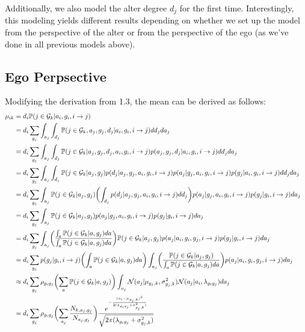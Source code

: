 \documentclass[12pt]{article}
\begin{document}
\noindent Additionally, we also model the alter degree $d_j$ for the first time. Interestingly, this modeling yields different results depending on whether we set up the model from the perspective of the alter or from the perspective of the ego (as we've done in all previous models above). 

\pagebreak
\subsection{Ego Perpsective}

\noindent Modifying the derivation from 1.3, the mean can be derived as follows:
\begin{align}
\mu_{ik} 
&= d_i \mathbb{P}( j \in \mathcal{G}_k | a_i, g_i, i \to j) && \\\nonumber
&= d_i \sum_{g_j} \int_{a_j} \int_{d_j} \mathbb{P}( j \in \mathcal{G}_k, a_j, g_j, d_j | a_i, g_i, i \to j) dd_j da_j && \\\nonumber
&= d_i \sum_{g_j} \int_{a_j} \int_{d_j} \mathbb{P}( j \in \mathcal{G}_k | a_j, g_j, d_j, a_i, g_i, i \to j) p(a_j, g_j, d_j | a_i, g_i, i \to j) dd_j da_j && \\\nonumber
&= d_i \sum_{g_j} \int_{a_j} \int_{d_j} \mathbb{P}( j \in \mathcal{G}_k | a_j, g_j) p(d_j | a_j, g_j, a_i, g_i, i \to j) 
p(a_j | g_j, a_i, g_i, i \to j) p(g_j | a_i, g_i, i \to j) dd_j da_j && \\\nonumber
&= d_i \sum_{g_j} \int_{a_j}  \mathbb{P}( j \in \mathcal{G}_k | a_j, g_j) \biggl( \int_{d_j}  p(d_j | a_j, g_j, a_i, g_i, i \to j) dd_j \biggr)
p(a_j | g_j, a_i, g_i, i \to j) p(g_j | g_i, i \to j) da_j && \\\nonumber
&= d_i \sum_{g_j} \int_{a_j}  \mathbb{P}( j \in \mathcal{G}_k | a_j, g_j) 
p(a_j | g_j, a_i, g_i, i \to j) p(g_j | g_i, i \to j) da_j && \\\nonumber
&= d_i \sum_{g_j} \int_{a_j} 
\biggl( \frac{ \int_{a} \mathbb{P}( j \in \mathcal{G}_k | a, g_j) da }{ \int_{a} \mathbb{P}( j \in \mathcal{G}_k | a, g_j) da } \biggr) 
\mathbb{P}( j \in \mathcal{G}_k | a_j, g_j) p(a_j | a_i, g_i, g_j, i \to j) p(g_j | g_i, i \to j) da_j && \\\nonumber
&= d_i \sum_{g_j} p(g_j | g_i, i \to j) 
\biggl( \int_{a} \mathbb{P}( j \in \mathcal{G}_k | a, g_j) da \biggr) 
\int_{a_j} \biggl( \frac{ \mathbb{P}( j \in \mathcal{G}_k | a_j, g_j) }{ \int_{a} \mathbb{P}( j \in \mathcal{G}_k | a, g_j) da } \biggr)
p(a_j | a_i, g_i, g_j, i \to j) da_j && \\\nonumber
&\approx d_i \sum_{g_j} \rho_{g_ig_j} 
\biggl( \sum_{a} \mathbb{P}( j \in \mathcal{G}_k | a, g_j) \biggr) 
\int_{a_j} \mathcal{N}(a_j | \mu_{g_j,k}, \sigma_{g_j,k}^2)
\mathcal{N}(a_j | a_i, \lambda_{g_ig_j}) da_j && \\\nonumber
&= d_i \sum_{g_j} \rho_{g_ig_j} 
\biggl( \sum_{a_j} \frac{ N_{k, a_j, g_j} }{ N_{a_j, g_j} } \biggr) 
\frac{ e^{ -\frac{ (a_i - \mu_{g_j,k})^2 }{ 2(\lambda_{g_ig_j} + \sigma_{g_j,k}^2) } } }{ \sqrt{ 2\pi(\lambda_{g_ig_j} + \sigma_{g_j,k}^2) } }
\end{align}
\end{document}
